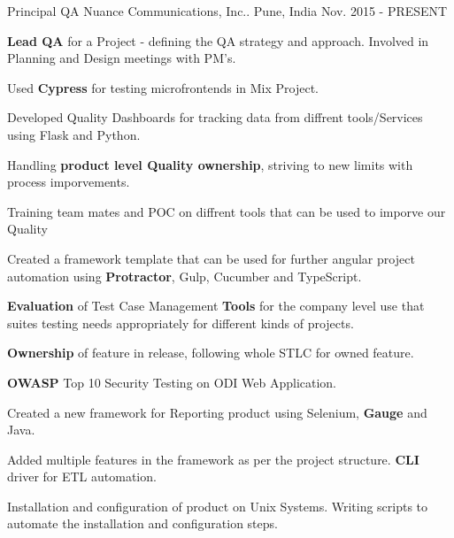 

\begin{cventries}

  \cventry
    {Principal QA} %
    {Nuance Communications, Inc..} %
    {Pune, India} %
    {Nov. 2015 - PRESENT} %
    {
      \begin{cvitems} %
	    \item {\textbf{Lead QA} for a Project - defining the QA strategy and approach. Involved in Planning and Design meetings with PM's.}
	    \item {Used \textbf{Cypress} for testing microfrontends in Mix Project.}
	    \item {Developed Quality Dashboards for tracking data from diffrent tools/Services using Flask and Python.}
	    \item {Handling \textbf{product level Quality ownership}, striving to new limits with process imporvements.}
	    \item {Training team mates and POC on diffrent tools that can be used to imporve our Quality}
		  \item {Created a framework template that can be used for further angular project automation using \textbf{Protractor}, Gulp, Cucumber and TypeScript.}
		  \item {\textbf{Evaluation} of Test Case Management \textbf{Tools} for the company level use that suites testing needs appropriately for different kinds of projects.}
      \item {\textbf{Ownership} of feature in release, following whole STLC for owned feature.}
		  \item {\textbf{OWASP} Top 10 Security Testing on ODI Web Application.}
      \item {Created a new framework for Reporting product using Selenium, \textbf{Gauge} and Java.}
      \item {Added multiple features in the framework as per the project structure. \textbf{CLI} driver for ETL automation.}
      \item {Installation and configuration of product on Unix Systems. Writing scripts to automate the installation and configuration steps.}
      \end{cvitems}
    }


\end{cventries}
